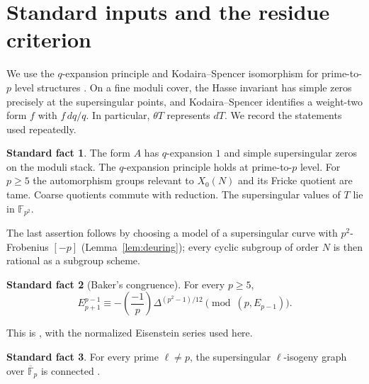 \documentclass[11pt,a4paper]{article}
\numberwithin{equation}{section}
\theoremstyle{definition}
\newtheorem{fact}{Standard fact}
\theoremstyle{remark}
\newcommand{\Fq}{\mathbb F_{p^2}}
\newcommand{\Fb}{\overline{\mathbb F}_p}
\newcommand{\Lp}[1]{\left(\frac{#1}{p}\right)}
\begin{document}
\section{Standard inputs and the residue criterion}\label{sec:imports}
We use the $q$-expansion principle and Kodaira--Spencer isomorphism for prime-to-$p$
level structures \citep{Katz73,KM85,Gross90}. On a fine moduli cover, the Hasse invariant
has simple zeros precisely at the supersingular points, and Kodaira--Spencer identifies
a weight-two form $f$ with $f\,dq/q$. In particular, $\theta T$ represents $dT$.
We record the statements used repeatedly.
\begin{fact}\label{fact:modp}
The form $A$ has $q$-expansion $1$ and simple supersingular zeros on the moduli stack.
The $q$-expansion principle holds at prime-to-$p$ level. For $p\ge5$ the automorphism
groups relevant to $X_0(N)$ and its Fricke quotient are tame. Coarse quotients
commute with reduction. The supersingular values of $T$ lie in $\Fq$.
\end{fact}
The last assertion follows by choosing a model of a supersingular curve with
$p^2$-Frobenius $[-p]$ (Lemma~\ref{lem:deuring}); every cyclic subgroup of order $N$
is then rational as a subgroup scheme.
\begin{fact}[Baker's congruence]\label{fact:baker}
For every $p\ge5$,
\[
E_{p+1}^{p-1}\equiv-\Lp{-1}\Delta^{(p^2-1)/12}\pmod{(p,E_{p-1})}.
\]
\end{fact}
This is \citet[Theorem~1.4]{Baker98}, with the normalized Eisenstein series used here.
\begin{fact}\label{fact:graph}
For every prime $\ell\ne p$, the supersingular $\ell$-isogeny graph over $\Fb$ is
connected \citep{Mestre86,Pizer90}.
\end{fact}
\end{document}
